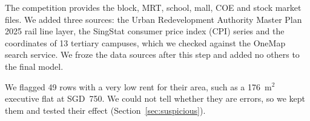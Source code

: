The competition provides the block, MRT, school, mall, COE and stock market files. We added three sources: the Urban Redevelopment Authority Master Plan 2025 rail line layer, the SingStat consumer price index (CPI) series and the coordinates of 13 tertiary campuses, which we checked against the OneMap search service. We froze the data sources after this step and added no others to the final model.

We flagged 49 rows with a very low rent for their area, such as a 176~m$^2$ executive flat at SGD~750. We could not tell whether they are errors, so we kept them and tested their effect (Section~\ref{sec:suspicious}).
